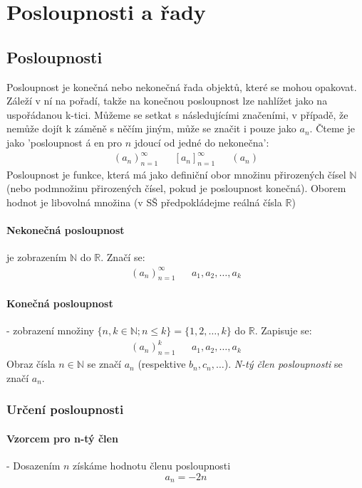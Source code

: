 \documentclass[12pt]{article}
\begin{document}
\section{Posloupnosti a řady}
\subsection{Posloupnosti}
Posloupnost je konečná nebo nekonečná řada objektů, které se mohou opakovat. Záleží v ní na pořadí, takže na konečnou posloupnost lze nahlížet jako na uspořádanou k-tici. Můžeme se setkat s následujícími značeními, v případě, že nemůže dojít k záměně s něčím jiným, může se značit i pouze jako $a_n$. Čteme je jako 'posloupnost á en pro $n$ jdoucí od jedné do nekonečna':
\begin{align}
\left( a_n \right)_{n=1}^{\infty} && \left[ a_n \right]_{n=1}^{\infty} && \left( a_n \right)
\end{align}
Posloupnost je funkce, která má jako definiční obor množinu přirozených čísel $\mathbb{N}$ (nebo podmnožinu přirozených čísel, pokud je posloupnost konečná). Oborem hodnot je libovolná množina (v SŠ předpokládejme reálná čísla $\mathbb{R}$)
\paragraph{Nekonečná posloupnost} je zobrazením $\mathbb{N}$ do $\mathbb{R}$. Značí se:
\begin{align}
\left( a_n \right)_{n=1}^{\infty} && a_1,a_2, \dotsc, a_k
\end{align}
\paragraph{Konečná posloupnost} - zobrazení  množiny $\{ n,k \in \mathbb{N}; n \leq k \} = \{1,2, \dotsc, k \}$ do $\mathbb{R}$. Zapisuje se:
\begin{align}
\left( a_n \right)_{n=1}^k && a_1, a_2, \dotsc, a_k
\end{align}
Obraz čísla $n \in \mathbb{N}$ se značí $a_n$ (respektive $b_n, c_n, \dotsc$). \emph{N-tý člen posloupnosti} se značí $a_n$.
\subsubsection{Určení posloupnosti}
\paragraph{Vzorcem pro n-tý člen} - Dosazením $n$ získáme hodnotu členu posloupnosti
\begin{equation}
a_n = -2n
\end{equation}
\end{document}
